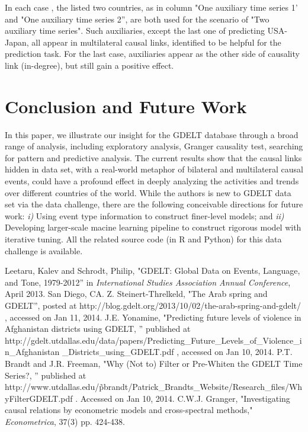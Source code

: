 \documentclass[runningheads,a4paper]{llncs}
\begin{document}
In each case , the listed two countries, as in column "One auxiliary time series 1' and "One auxiliary time series 2'', are both used for the scenario of "Two auxiliary time series". Such auxiliaries, except the last one of predicting USA-Japan, all appear in multilateral causal links, identified to be helpful for the prediction task.  For the last case, auxiliaries appear as the other side of causality link (in-degree), but still gain a positive effect. 


\section{Conclusion and Future Work}
\label{conclusion}
In this paper, we illustrate our insight for the GDELT database through a broad range of analysis, including exploratory analysis, Granger causality test, searching for pattern and predictive analysis. The current results show that the causal links hidden in data set, with a real-world metaphor of bilateral and multilateral causal events, could have a profound effect in deeply analyzing the activities and trends over different countries of the world. While the authors is new to GDELT data set via the data  challenge, there are the following conceivable directions for future work: {\em i)} Using event type information to construct finer-level models; and {\em ii)} Developing larger-scale macine learning pipeline to construct rigorous model with iterative tuning. All the related source code (in R and Python) for this data challenge is available\footnotemark[1].



\begin{thebibliography}{1}
 Leetaru, Kalev and Schrodt, Philip, "GDELT: Global Data on Events, Language, and Tone, 1979-2012'' in {\em International Studies Association Annual Conference}, April 2013. San Diego, CA.
 Z. Steinert-Threlkeld, "The Arab spring and GDELT'', posted at http://blog.gdelt.org/2013/10/02/the-arab-spring-and-gdelt/ , accessed on Jan 11, 2014.
 J.E. Yonamine, "Predicting future levels of violence in Afghanistan districts using GDELT, ''  published at http://gdelt.utdallas.edu/data/papers/Predicting\_Future\_Levels\_of\_Violence\_in\_Afghanistan
\_Districts\_using\_GDELT.pdf , accessed on Jan 10, 2014.
 P.T. Brandt and J.R. Freeman, "Why (Not to) Filter or Pre-Whiten the GDELT Time Series?, '' published at http://www.utdallas.edu/\~pbrandt/Patrick\_Brandts\_Website/Research\_files/WhyFilterGDELT.pdf . Accessed on Jan 10, 2014. 
 C.W.J. Granger, "Investigating causal relations by econometric models and cross-spectral methods," {\em Econometrica}, 37(3) pp. 424-438.


\end{thebibliography}
\end{document}
